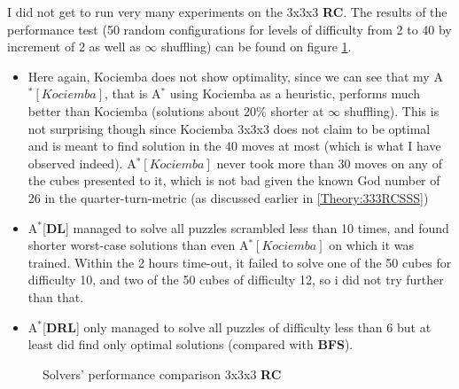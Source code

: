 \label{sec:ResRubiks333}

I did not get to run very many experiments on the 3x3x3 \textbf{RC}. The results of the performance test (50 random configurations for levels of difficulty from 2 to 40 by increment of 2 as well as $\infty$ shuffling) can be found on figure \ref{fig:333RCPerformance}.
\begin{itemize}
\item Here again, Kociemba does not show optimality, since we can see that my A$^{*}[Kociemba]$, that is A$^{*}$ using Kociemba as a heuristic, performs much better than Kociemba (solutions about 20\% shorter at $\infty$ shuffling). This is not surprising though since Kociemba 3x3x3 does not claim to be optimal and is meant to find solution in the 40 moves at most (which is what I have observed indeed). A$^{*}[Kociemba]$ never took more than 30 moves on any of the cubes presented to it, which is not bad given the known God number of 26 in the quarter-turn-metric (as discussed earlier in \ref{Theory:333RCSSS})
\item A$^{*}$[\textbf{DL}] managed to solve all puzzles scrambled less than 10 times, and found shorter worst-case solutions than even A$^{*}[Kociemba]$ on which it was trained. Within the 2 hours time-out, it failed to solve one of the 50 cubes for difficulty 10, and two of the 50 cubes of difficulty 12, so i did not try further than that.
\item A$^{*}$[\textbf{DRL}] only managed to solve all puzzles of difficulty less than 6 but at least did find only optimal solutions (compared with \textbf{BFS}).
\end{itemize}


\begin{figure}[H]
  \noindent
  \caption[333RCPerformance]{Solvers' performance comparison 3x3x3 \textbf{RC}}
  \label{fig:333RCPerformance}
\end{figure}
